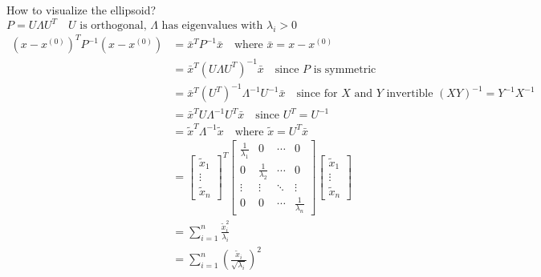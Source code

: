 \begin{derivation}
    How to visualize the ellipsoid? $P = U \Lambda U^T \quad \text{$U$ is orthogonal, $\Lambda$ has eigenvalues with $\lambda_i>0$}$
    \begin{align*}
        (x - x^{(0)})^T P^{-1} (x - x^{(0)}) &= \bar{x}^T P^{-1} \bar{x} \quad \text{where } \bar{x} = x - x^{(0)} \\
        &= \bar{x}^T \left( U \Lambda U^T \right)^{-1} \bar{x} \quad \text{since $P$ is symmetric}\\
        &= \bar{x}^T (U^{T})^{-1} \Lambda^{-1} U^{-1} \bar{x} \quad \text{since for $X$ and $Y$ invertible } (XY)^{-1} = Y^{-1} X^{-1} \\
        &= \bar{x}^T U \Lambda^{-1} U^T \bar{x} \quad \text{since } U^T = U^{-1} \\
        &= \tilde{x}^T \Lambda^{-1} \tilde{x} \quad \text{where $\tilde{x} = U^T \bar{x}$}\\
        &= \begin{bmatrix}
            \tilde{x}_1 \\
            \vdots \\
            \tilde{x}_n
            \end{bmatrix}^T
            \begin{bmatrix}
            \frac{1}{\lambda_1} & 0 & \cdots & 0 \\
            0 & \frac{1}{\lambda_2} & \cdots & 0 \\
            \vdots & \vdots & \ddots & \vdots \\
            0 & 0 & \cdots & \frac{1}{\lambda_n}
            \end{bmatrix}
            \begin{bmatrix}
            \tilde{x}_1 \\
            \vdots \\
            \tilde{x}_n
            \end{bmatrix} \\ 
        &= \sum_{i=1}^{n} \frac{\tilde{x}_i^2}{\lambda_i} \\
        &= \sum_{i=1}^{n} \left(\frac{\tilde{x}_i}{\sqrt{\lambda_i}}\right)^2
    \end{align*} 
\end{derivation}

